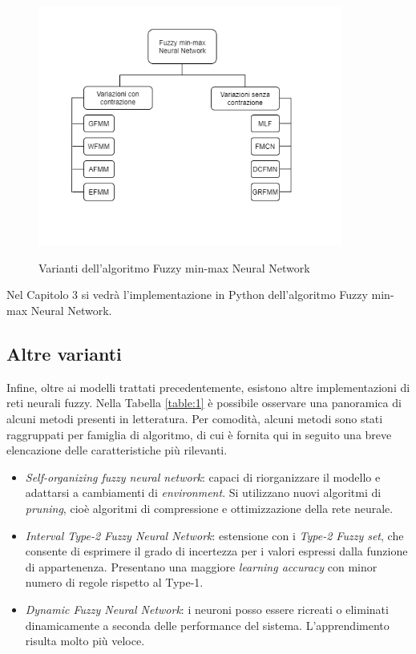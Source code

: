 \documentclass[11pt,  oneside, openany]{book}
\begin{document}
\begin{figure}[h!]
\begin{center}
  \includegraphics[width=10cm]{Immagini/varianti_FMMNN.png}\\
  \caption{Varianti dell'algoritmo Fuzzy min-max Neural Network}
\end{center}
\end{figure}

Nel Capitolo 3 si vedrà l'implementazione in Python dell'algoritmo Fuzzy min-max Neural Network.

\subsection{Altre varianti}

Infine, oltre ai modelli trattati precedentemente, esistono altre implementazioni di reti neurali fuzzy. Nella Tabella \ref{table:1} è possibile osservare una panoramica di alcuni metodi presenti in letteratura. Per comodità, alcuni metodi sono stati raggruppati per famiglia di algoritmo, di cui è fornita qui in seguito una breve elencazione delle caratteristiche più rilevanti. 

\begin{itemize}
\item \textit{Self-organizing fuzzy neural network}:  capaci di riorganizzare il modello e adattarsi a cambiamenti di \textit{environment}. Si utilizzano nuovi algoritmi di \textit{pruning}, cioè algoritmi di compressione e ottimizzazione della rete neurale. 
\item \textit{Interval Type-2 Fuzzy Neural Network}: estensione con i \textit{Type-2 Fuzzy set}, che consente di esprimere il grado di incertezza per i valori espressi dalla funzione di appartenenza. Presentano una maggiore \textit{learning accuracy} con minor numero di regole rispetto al Type-1.
\item \textit{Dynamic Fuzzy Neural Network}: i neuroni posso essere ricreati o eliminati dinamicamente a seconda delle performance del sistema. L'apprendimento risulta molto più veloce. 
\end{itemize}
\end{document}
